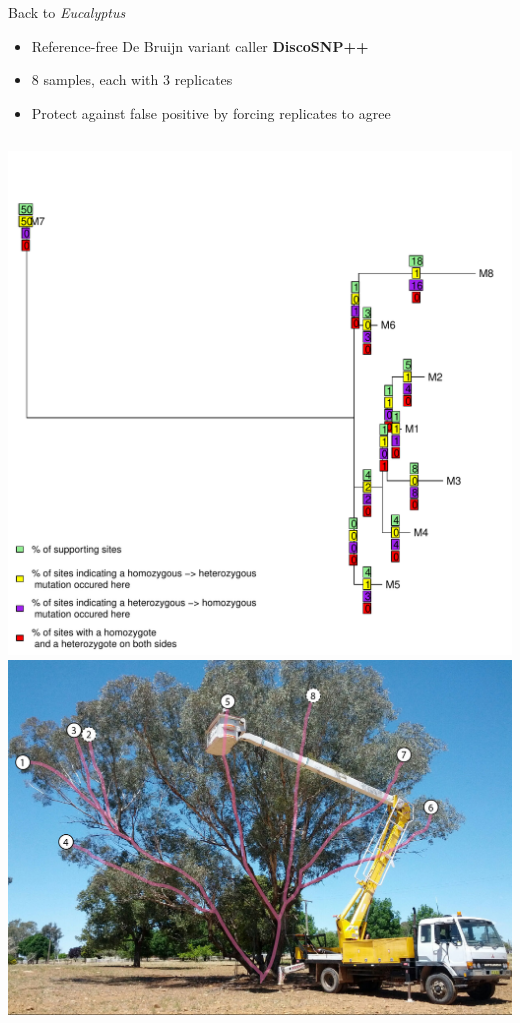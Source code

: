 \documentclass{beamer}
\begin{document}
\begin{frame}{Back to \textit{Eucalyptus}}
	\begin{itemize}
	\item Reference-free De Bruijn variant caller \textbf{DiscoSNP++}
	\item 8 samples, each with 3 replicates
	\item Protect against false positive by forcing replicates to agree
	\end{itemize}
	\begin{columns}
		\includegraphics[width=\linewidth]{figures/disco_tree.pdf}
		\includegraphics[width=\linewidth]{figures/labeled_tree.jpg}
	\end{columns}
\end{frame}
\end{document}
